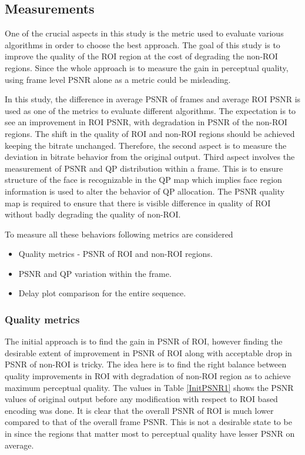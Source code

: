 \documentclass[11pt]{article} %
\begin{document}
\subsection{Measurements}
One of the crucial aspects in this study is the metric used to evaluate various algorithms in order to choose the best approach. The goal of this study is to improve the quality of the ROI region at the cost of degrading the non-ROI regions. Since the whole approach is to measure the gain in perceptual quality, using frame level PSNR alone as a metric could be misleading. 

In this study, the difference in average PSNR of frames and average ROI PSNR is used as one of the metrics to evaluate different algorithms. The expectation is to see an improvement in ROI PSNR, with degradation in PSNR of the non-ROI regions. The shift in the quality of ROI and non-ROI regions should be achieved keeping the bitrate unchanged. Therefore, the second aspect is to measure the deviation in bitrate behavior from the original output. Third aspect involves the measurement of PSNR and QP distribution within a frame. This is to ensure structure of the face is recognizable in the QP map which implies face region information is used to alter the behavior of QP allocation. The PSNR quality map is required to ensure that there is visible difference in quality of ROI without badly degrading the quality of non-ROI. 

To measure all these behaviors following metrics are considered
\begin{itemize}  
\item Quality metrics - PSNR of ROI and non-ROI regions.
\item PSNR and QP variation within the frame.
\item Delay plot comparison for the entire sequence.
\end{itemize}
\subsubsection{Quality metrics}
The initial approach is to find the gain in PSNR of ROI, however finding the desirable extent of improvement in PSNR of ROI along with acceptable drop in PSNR of non-ROI is tricky. The idea here is to find the right balance between quality improvements in ROI with degradation of non-ROI region as to achieve maximum perceptual quality. The values in Table \ref{InitPSNR1} shows the PSNR values of original output before any modification with respect to ROI based encoding was done. It is clear that the overall PSNR of ROI is much lower compared to that of the overall frame PSNR. This is not a desirable state to be in since the regions that matter most to perceptual quality have lesser PSNR on average.
\end{document}
